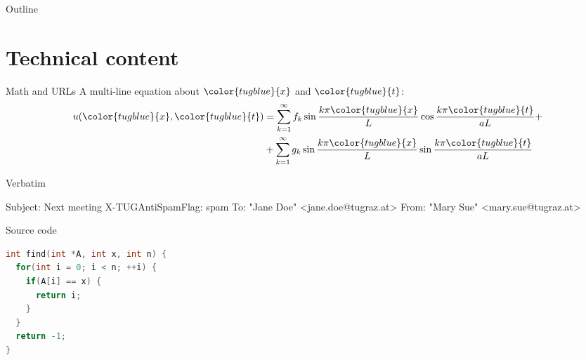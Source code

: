 \documentclass[table,aspectratio=43]{beamer}
\begin{document}
\begin{frame}{Outline}
  \tableofcontents[currentsection]
\end{frame}




\section{Technical content}

\newcommand{\blue}[1]{{\color{tugblue}{#1}}}
\begin{frame}{Math and URLs}
  A multi-line equation about $\blue{x}$ and $\blue{t}$:
	\begin{align*}
    u(\blue{x},\blue{t}) &= \sum_{k=1}^{\infty} f_k \sin \frac{k \pi \blue{x}}{L} \cos \frac{k \pi \blue{t}}{aL} + \\
                         & + \sum_{k=1}^{\infty} g_k \sin \frac{k \pi \blue{x}}{L} \sin \frac{k \pi \blue{t}}{aL}
	\end{align*}
\end{frame}

\begin{frame}[fragile]{Verbatim}
	\begin{semiverbatim}
Subject: Next meeting
\alert{X-TUGAntiSpamFlag: spam}
To: "Jane Doe" <jane.doe@tugraz.at>
From: "Mary Sue" <mary.sue@tugraz.at>
	\end{semiverbatim}
\end{frame}

\begin{frame}[fragile]{Source code}
  \begin{lstlisting}[language=C,basicstyle=\ttfamily]
int find(int *A, int x, int n) {
  for(int i = 0; i < n; ++i) {
    if(A[i] == x) {
      return i;
    }
  }
  return -1;
}
  \end{lstlisting}
\end{frame}
\end{document}
